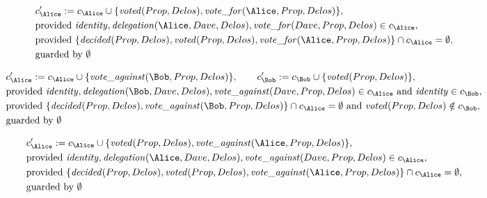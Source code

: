 \begin{align*}
&
c'_
{
\Alice
}
 := 
c_
{
\Alice
}
 \cup 
\{
\mathit{\detokenize{
voted
}}
(
Prop
,
Delos
)
,
\mathit{\detokenize{
vote_for
}}
(
\Alice
,
Prop
,
Delos
)
\}
,\\
&
\text{provided } 
\mathit{\detokenize{
identity
}}
,
\mathit{\detokenize{
delegation
}}
(
\Alice
,
Dave
,
Delos
)
,
\mathit{\detokenize{
vote_for
}}
(
Dave
,
Prop
,
Delos
)
 \in c_
{
\Alice
}
,\\
&
\text{provided } 
\{
\mathit{\detokenize{
decided
}}
(
Prop
,
Delos
)
,
\mathit{\detokenize{
voted
}}
(
Prop
,
Delos
)
,
\mathit{\detokenize{
vote_for
}}
(
\Alice
,
Prop
,
Delos
)
\}
 \cap c_
{
\Alice
}
 = \emptyset
,\\
&
\text{guarded by } \emptyset
\end{align*}

\begin{align*}
&
c'_
{
\Alice
}
 := 
c_
{
\Alice
}
 \cup 
\{
\mathit{\detokenize{
vote_against
}}
(
\Bob
,
Prop
,
Delos
)
\}
, \qquad 
c'_
{
\Bob
}
 := 
c_
{
\Bob
}
 \cup 
\{
\mathit{\detokenize{
voted
}}
(
Prop
,
Delos
)
\}
,\\
&
\text{provided } 
\mathit{\detokenize{
identity
}}
,
\mathit{\detokenize{
delegation
}}
(
\Bob
,
Dave
,
Delos
)
,
\mathit{\detokenize{
vote_against
}}
(
Dave
,
Prop
,
Delos
)
 \in c_
{
\Alice
}
 \text{ and } 
\mathit{\detokenize{
identity
}}
 \in c_
{
\Bob
}
,\\
&
\text{provided } 
\{
\mathit{\detokenize{
decided
}}
(
Prop
,
Delos
)
,
\mathit{\detokenize{
vote_against
}}
(
\Bob
,
Prop
,
Delos
)
\}
 \cap c_
{
\Alice
}
 = \emptyset
 \text{ and } 
\mathit{\detokenize{
voted
}}
(
Prop
,
Delos
)
 \notin c_
{
\Bob
}
,\\
&
\text{guarded by } \emptyset
\end{align*}

\begin{align*}
&
c'_
{
\Alice
}
 := 
c_
{
\Alice
}
 \cup 
\{
\mathit{\detokenize{
voted
}}
(
Prop
,
Delos
)
,
\mathit{\detokenize{
vote_against
}}
(
\Alice
,
Prop
,
Delos
)
\}
,\\
&
\text{provided } 
\mathit{\detokenize{
identity
}}
,
\mathit{\detokenize{
delegation
}}
(
\Alice
,
Dave
,
Delos
)
,
\mathit{\detokenize{
vote_against
}}
(
Dave
,
Prop
,
Delos
)
 \in c_
{
\Alice
}
,\\
&
\text{provided } 
\{
\mathit{\detokenize{
decided
}}
(
Prop
,
Delos
)
,
\mathit{\detokenize{
voted
}}
(
Prop
,
Delos
)
,
\mathit{\detokenize{
vote_against
}}
(
\Alice
,
Prop
,
Delos
)
\}
 \cap c_
{
\Alice
}
 = \emptyset
,\\
&
\text{guarded by } \emptyset
\end{align*}
